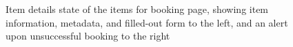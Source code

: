 \begin{figure}
    \centering
    \hfill
    \caption[Items for booking page -- Item details]{Item details state of the items for booking page, showing item information, metadata, and filled-out form to the left, and an alert upon unsuccessful booking to the right}
    \label{fig:items_for_booking_page_item_details}
\end{figure}

